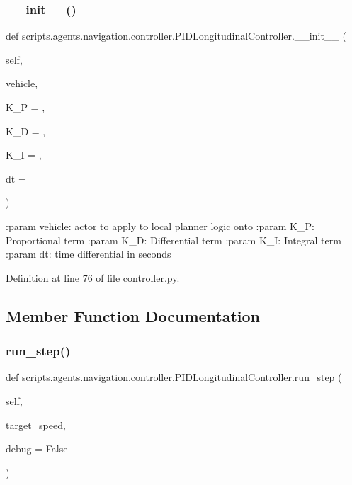 \subsubsection{\texorpdfstring{\+\_\+\+\_\+init\+\_\+\+\_\+()}{\_\_init\_\_()}}
{\footnotesize\ttfamily def scripts.\+agents.\+navigation.\+controller.\+P\+I\+D\+Longitudinal\+Controller.\+\_\+\+\_\+init\+\_\+\+\_\+ (\begin{DoxyParamCaption}\item[{}]{self,  }\item[{}]{vehicle,  }\item[{}]{K\+\_\+P = {},  }\item[{}]{K\+\_\+D = {},  }\item[{}]{K\+\_\+I = {},  }\item[{}]{dt = {} }\end{DoxyParamCaption})}

\begin{DoxyVerb}:param vehicle: actor to apply to local planner logic onto
:param K_P: Proportional term
:param K_D: Differential term
:param K_I: Integral term
:param dt: time differential in seconds
\end{DoxyVerb}
 

Definition at line 76 of file controller.\+py.



\subsection{Member Function Documentation}
\mbox{\label{classscripts_1_1agents_1_1navigation_1_1controller_1_1PIDLongitudinalController_a471042867b5f536887249e9d49c6ba81}} 
\subsubsection{\texorpdfstring{run\+\_\+step()}{run\_step()}}
{\footnotesize\ttfamily def scripts.\+agents.\+navigation.\+controller.\+P\+I\+D\+Longitudinal\+Controller.\+run\+\_\+step (\begin{DoxyParamCaption}\item[{}]{self,  }\item[{}]{target\+\_\+speed,  }\item[{}]{debug = {\ttfamily False} }\end{DoxyParamCaption})}

